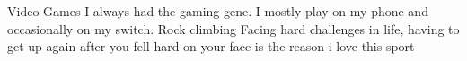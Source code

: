 



\begin{cvskills}
  \cvskill
    {Video Games} %
    {I always had the gaming gene. I mostly play on my phone and occasionally on my switch.} %
  \cvskill
    {Rock climbing} %
    {Facing hard challenges in life, having to get up again after you fell hard on your face is the reason i love this sport} %

\end{cvskills}
